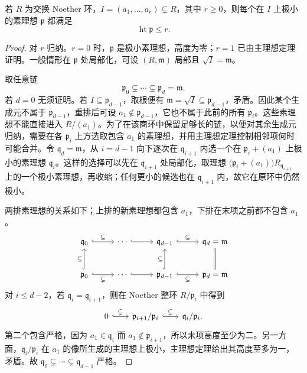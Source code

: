 \begin{theorem}[广义高度定理]\label{b3:thm:height-theorem}
	若 \(R\) 为交换 Noether 环，\(I=(a_1,\ldots,a_r)\subsetneq R\)，其中 \(r\ge0\)，则每个在 \(I\) 上极小的素理想 \(\mathfrak p\) 都满足
	\[
		\operatorname{ht}\mathfrak p\le r.
	\]
\end{theorem}
\begin{proof}
	对 \(r\) 归纳。\(r=0\) 时，\(\mathfrak p\) 是极小素理想，高度为零；\(r=1\) 已由主理想定理证明。一般情形在 \(\mathfrak p\) 处局部化，可设 \((R,\mathfrak m)\) 局部且 \(\sqrt I=\mathfrak m\)。

	取任意链
	\[
		\mathfrak p_0\subsetneq\cdots\subsetneq\mathfrak p_d=\mathfrak m.
	\]
	若 \(d=0\) 无须证明。若 \(I\subseteq\mathfrak p_{d-1}\)，取根便有 \(\mathfrak m=\sqrt I\subseteq\mathfrak p_{d-1}\)，矛盾。因此某个生成元不属于 \(\mathfrak p_{d-1}\)，重排后可设 \(a_1\notin\mathfrak p_{d-1}\)，它也不属于此前的所有 \(\mathfrak p_i\)。这些素理想不能直接进入 \(R/(a_1)\)。为了在该商环中保留足够长的链，以便对其余生成元归纳，需要在各 \(\mathfrak p_i\) 上方选取包含 \(a_1\) 的素理想，并用主理想定理控制相邻项何时可能合并。令 \(\mathfrak q_d=\mathfrak m\)，从 \(i=d-1\) 向下逐次在 \(\mathfrak q_{i+1}\) 内选一个在 \(\mathfrak p_i+(a_1)\) 上极小的素理想 \(\mathfrak q_i\)。这样的选择可以先在 \(\mathfrak q_{i+1}\) 处局部化，取理想 \(\bigl(\mathfrak p_i+(a_1)\bigr)R_{\mathfrak q_{i+1}}\) 上的一个极小素理想，再收缩；任何更小的候选也在 \(\mathfrak q_{i+1}\) 内，故它在原环中仍然极小。

	两排素理想的关系如下；上排的新素理想都包含 \(a_1\)，下排在末项之前都不包含 \(a_1\)。
	\[
		\begin{tikzcd}[column sep=2.7em,row sep=2.5em]
			\mathfrak q_0 \arrow[r,hook,"\subseteq"] & \cdots \arrow[r,hook] & \mathfrak q_{d-1} \arrow[r,hook,"\subseteq"] & \mathfrak q_d=\mathfrak m \\
			\mathfrak p_0 \arrow[u,hook,"\subseteq"] \arrow[r,hook,"\subsetneq"'] & \cdots \arrow[r,hook] & \mathfrak p_{d-1} \arrow[u,hook,"\subseteq"] \arrow[r,hook,"\subsetneq"'] & \mathfrak p_d=\mathfrak m \arrow[u,equal]
		\end{tikzcd}
	\]
	对 \(i\le d-2\)，若 \(\mathfrak q_i=\mathfrak q_{i+1}\)，则在 Noether 整环 \(R/\mathfrak p_i\) 中得到
	\[
		\begin{tikzcd}[column sep=2em]
			0\arrow[r,hook,"\subsetneq"] &\mathfrak p_{i+1}/\mathfrak p_i\arrow[r,hook,"\subsetneq"] &\mathfrak q_i/\mathfrak p_i.
		\end{tikzcd}
	\]
	第二个包含严格，因为 \(a_1\in\mathfrak q_i\) 而 \(a_1\notin\mathfrak p_{i+1}\)，所以末项高度至少为二。另一方面，\(\mathfrak q_i/\mathfrak p_i\) 在 \(a_1\) 的像所生成的主理想上极小，主理想定理给出其高度至多为一，矛盾。故 \(\mathfrak q_0\subsetneq\cdots\subsetneq\mathfrak q_{d-1}\) 严格。


\end{proof}
